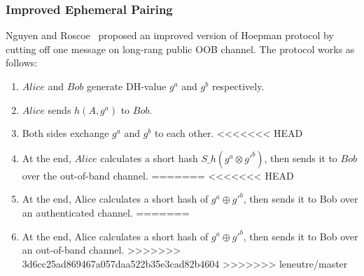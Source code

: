 \subsubsection*{Improved Ephemeral Pairing}

Nguyen and Roscoe~\cite{Nguyen09authenticationprotocols} proposed an improved version of Hoepman protocol by cutting off one message on long-rang public OOB channel. The protocol works as follows:
\begin{enumerate}
\item $Alice$ and $Bob$ generate DH-value $g^a$ and $g^b$ respectively. 
\item $Alice$ sends $h(A,g^a)$ to $Bob$. 
\item Both sides exchange $g^a$ and $g^b$ to each other. 
<<<<<<< HEAD
\item At the end, $Alice$ calculates a short hash $S\_h(g^a\otimes g'^b)$, then sends it to $Bob$ over the out-of-band channel. 
=======
<<<<<<< HEAD
\item At the end, Alice calculates a short hash of $g^a \oplus g'^b$, then sends it to Bob over an authenticated channel. 
=======
\item At the end, Alice calculates a short hash of $g^a \oplus g'^b$, then sends it to Bob over an out-of-band channel. 
>>>>>>> 3d6cc25ad869467a057daa522b35e3cad82b4604
>>>>>>> leneutre/master
\end{enumerate}

\begin{center}
\end{center}

